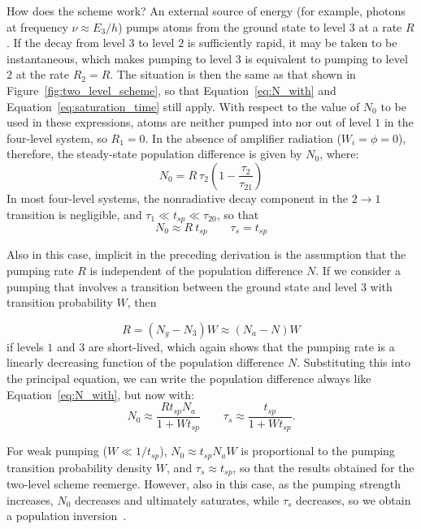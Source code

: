 \documentclass[prl,twocolumn]{revtex4-1}
\begin{document}
How does the scheme work? An external source of energy (for example, photons at frequency $\nu \approx E_3/h$) pumps atoms from the ground state to level $3$ at a rate $R$. If the decay from level $3$ to level $2$ is sufficiently rapid, it may be taken to be instantaneous, which makes pumping to level $3$ is equivalent to pumping to level $2$ at the rate $R_2 = R$. The situation is then the same as that shown in Figure~\ref{fig:two_level_scheme}, so that Equation~\ref{eq:N_with} and Equation~\ref{eq:saturation_time} still apply. With respect to the value of $N_0$ to be used in these expressions, atoms are neither pumped into nor out of level $1$ in the four-level system, so $R_1 = 0$. In the absence of amplifier radiation ($W_i = \phi = 0$), therefore, the steady-state population difference is given by $N_0$, where:
%
\begin{equation}
    N_0 = R\: \tau_2 \left(1-\frac{\tau_2}{\tau_{21}}\right)
\end{equation}
%
In most four-level systems, the nonradiative decay component in the $2 \rightarrow 1$ transition is negligible, and $\tau_1 \ll t_{sp} \ll \tau_{20}$, so that
%
\begin{equation}
\label{eq:results_four}
N_0 \approx R \: t_{sp} \quad \quad \tau_s=t_{sp}
\end{equation}

Also in this case, implicit in the preceding derivation is the assumption that the pumping rate $R$ is independent of the population difference $N$. If we consider a pumping that involves a transition between the ground state and level $3$ with transition probability $W$, then

\begin{equation}
    R = (N_g - N_3)W\approx (N_a - N)W
\end{equation}
%
if levels $1$ and $3$ are short-lived, which again shows that the pumping rate is a linearly decreasing function of the population difference $N$. 
Substituting this into the principal equation, we can write the population difference always like Equation~\eqref{eq:N_with}, but now with:
%
\begin{equation}
    N_0 \approx \frac{R t_{sp} N_a}{1 + W t_{sp}} \quad \quad \tau_s \approx \frac{t_{sp}}{1 + W t_{sp}}.
\end{equation}

For weak pumping ($W \ll 1/t_{sp}$), $N_0 \approx t_{sp} N_a W$ is proportional to the pumping transition probability density $W$, and $\tau_s \approx t_{sp}$, so that the results obtained for the two-level scheme reemerge. However, also in this case, as the pumping strength increases, $N_0$ decreases and ultimately saturates, while $\tau_s$ decreases, so we obtain a population inversion~\cite{Saleh2007}.
\end{document}
